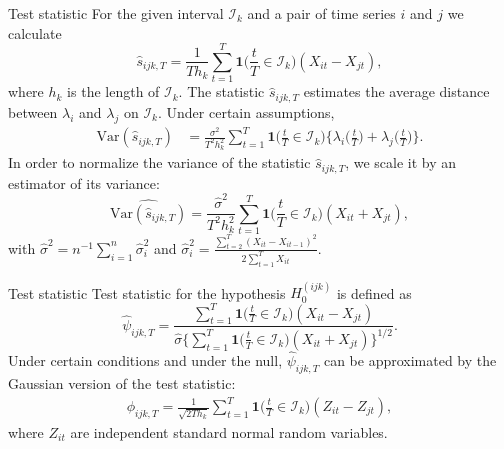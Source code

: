 \documentclass[10pt]{beamer}
\newcommand{\Var}{\mathrm{Var}}
\newcommand{\ind}{\boldsymbol{1}\Big( \frac{t}{T} \in \mathcal{I}_k \Big)} %
\newcommand{\indsmall}{\boldsymbol{1}\big( \frac{t}{T} \in \mathcal{I}_k \big)} %
\begin{document}
\begin{frame}{Test statistic}
For the given interval $\mathcal{I}_k$ and a pair of time series $i$ and $j$ we calculate
\begin{equation*}
\hat{s}_{ijk,T} = \frac{1}{T h_k} \sum\limits_{t=1}^T \ind (X_{it} -X_{jt}), 
\end{equation*}
where $h_k$ is the length of $\mathcal{I}_k$. \pause The statistic $\hat{s}_{ijk,T}$ estimates the average distance between $\lambda_i$ and $\lambda_j$ on $\mathcal{I}_k$. \pause Under certain assumptions, 
\begin{align*}
\Var(\hat{s}_{ijk,T})  & = \frac{\sigma^2}{T^2 h_k^2} \sum\limits_{t=1}^T \ind \Big\{ \lambda_i\Big(\frac{t}{T}\Big) + \lambda_j\Big(\frac{t}{T}\Big) \Big\}. 
\end{align*}\pause
In order to normalize the variance of the statistic $\hat{s}_{ijk,T}$, we scale it by an estimator of its variance:
\[ \widehat{\Var(\hat{s}_{ijk,T})} = \frac{\hat{\sigma}^2}{T^2 h_k^2} \sum\limits_{t=1}^T \ind (X_{it} + X_{jt} ), \]
with $\hat{\sigma}^2 = n^{-1} \sum_{i = 1}^n \hat{\sigma}_i^2$ and $\hat{\sigma}_i^2 = \frac{\sum_{t=2}^T (X_{it}-X_{it-1})^2}{2 \sum_{t=1}^T X_{it}}$.\hyperlink{frame_sigma}{}
\end{frame}


\begin{frame}[label = frame_teststatistic]{Test statistic}
Test statistic for the hypothesis $H_0^{(ijk)}$ is defined as
\begin{equation*}
\widehat{\psi}_{ijk, T} = \frac{\sum\nolimits_{t=1}^T \indsmall (X_{it} -X_{jt})}{\hat{\sigma} \big\{ \sum\nolimits_{t=1}^T \indsmall  (X_{it} + X_{jt} )\big\}^{1/2}}. 
\end{equation*} \pause
Under certain conditions and under the null, $\widehat{\psi}_{ijk, T}$ can be approximated by the Gaussian version of the test statistic:
\begin{align*}
\phi_{ijk,T} = \frac{1}{\sqrt{2 T h_k}} \sum\limits_{t=1}^T \ind (Z_{it} - Z_{jt}), 
\end{align*}
where $Z_{it}$ are independent standard normal random variables.
\end{frame}
\end{document}
